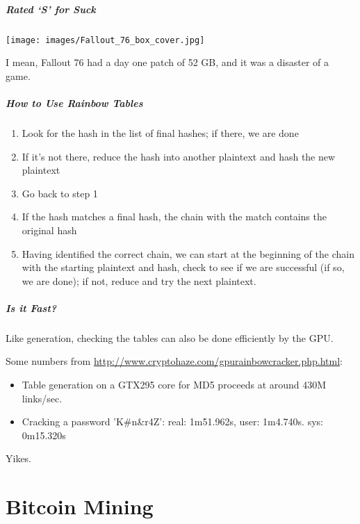 \begin{frame}
\frametitle{Rated `S' for Suck}

\begin{center}
\texttt{[image: images/Fallout\_76\_box\_cover.jpg]}
\end{center}

I mean, Fallout 76 had a day one patch of 52 GB, and it was a disaster of a game.

\end{frame}


\begin{frame}
\frametitle{How to Use Rainbow Tables}

\begin{enumerate}
	\item Look for the hash in the list of final hashes; if there, we are done
	\item If it's not there, reduce the hash into another plaintext and hash the new plaintext
	\item Go back to step 1
	\item If the hash matches a final hash, the chain with the match contains the original hash
	\item Having identified the correct chain, we can start at the beginning of the chain with the starting plaintext and hash, check to see if we are successful (if so, we are done); if not, reduce and try the next plaintext. 
\end{enumerate} 

\end{frame}


\begin{frame}
\frametitle{Is it Fast?}

Like generation, checking the tables can also be done efficiently by the GPU.

Some numbers from \url{http://www.cryptohaze.com/gpurainbowcracker.php.html}: 

\begin{itemize}
	\item Table generation on a GTX295 core for MD5 proceeds at around 430M links/sec.
	\item Cracking a password 'K\#n\&r4Z': real: 1m51.962s, user: 1m4.740s. sys: 0m15.320s
\end{itemize}

Yikes.

\end{frame}

\part{Bitcoin Mining}

